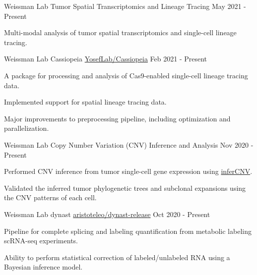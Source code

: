 

\begin{cventries}

\cventry
  {Weissman Lab} %
  {Tumor Spatial Transcriptomics and Lineage Tracing} %
  {} %
  {May 2021 - Present} %
  {
    \begin{cvitems} %
      \item {Multi-modal analysis of tumor spatial transcriptomics and single-cell lineage tracing.}
    \end{cvitems}
  }


\cventry
  {Weissman Lab} %
  {Cassiopeia} %
  {\faGithub\phantom{a}\href{https://github.com/YosefLab/Cassiopeia}{YosefLab/Cassiopeia}} %
  {Feb 2021 - Present} %
  {
    \begin{cvitems} %
      \item {A package for processing and analysis of Cas9-enabled single-cell lineage tracing data.}
      \item {Implemented support for spatial lineage tracing data.}
      \item {Major improvements to preprocessing pipeline, including optimization and parallelization.}
    \end{cvitems}
  }

\cventry
  {Weissman Lab} %
  {Copy Number Variation (CNV) Inference and Analysis} %
  {}
  {Nov 2020 - Present}
  {
    \begin{cvitems} %
      \item {Performed CNV inference from tumor single-cell gene expression using \href{https://github.com/broadinstitute/infercnv}{inferCNV}.}
      \item {Validated the inferred tumor phylogenetic trees and subclonal expansions using the CNV patterns of each cell.}
    \end{cvitems}
  }

\cventry
  {Weissman Lab} %
  {dynast} %
  {\faGithub\phantom{a}\href{https://github.com/aristoteleo/dynast-release}{aristoteleo/dynast-release}} %
  {Oct 2020 - Present} %
  {
    \begin{cvitems} %
      \item {Pipeline for complete splicing and labeling quantification from metabolic labeling scRNA-seq experiments.}
      \item {Ability to perform statistical correction of labeled/unlabeled RNA using a Bayesian inference model.}
    \end{cvitems}
  }



\end{cventries}
